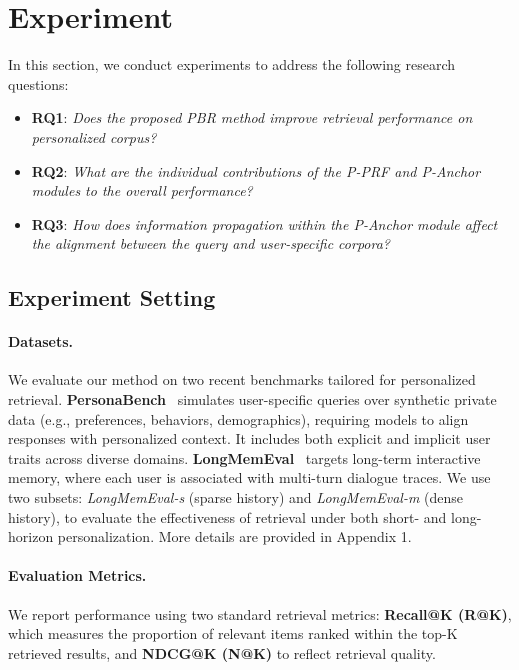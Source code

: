 \section{Experiment}


In this section, we conduct experiments to address the following research questions:
\begin{itemize}[leftmargin=*]
    \item \textbf{RQ1}: \emph{Does the proposed PBR method improve retrieval performance on personalized corpus?}
    \item \textbf{RQ2}: \emph{What are the individual contributions of the P-PRF and P-Anchor modules to the overall performance?}
    \item \textbf{RQ3}: \emph{How does information propagation within the P-Anchor module affect the alignment between the query and user-specific corpora?}
\end{itemize}

\subsection{Experiment Setting}

\paragraph{Datasets.}
We evaluate our method on two recent benchmarks tailored for personalized retrieval. \textbf{PersonaBench}~\cite{tan2025personabench} simulates user-specific queries over synthetic private data (e.g., preferences, behaviors, demographics), requiring models to align responses with personalized context. It includes both explicit and implicit user traits across diverse domains. \textbf{LongMemEval}~\cite{wu2025longmemeval} targets long-term interactive memory, where each user is associated with multi-turn dialogue traces. We use two subsets: \textit{LongMemEval-s} (sparse history) and \textit{LongMemEval-m} (dense history), to evaluate the effectiveness of retrieval under both short- and long-horizon personalization. More details are provided in Appendix 1.

\paragraph{Evaluation Metrics.}
We report performance using two standard retrieval metrics: \textbf{Recall@K (R@K)}, which measures the proportion of relevant items ranked within the top-K retrieved results, and \textbf{NDCG@K (N@K)} to reflect retrieval quality.


